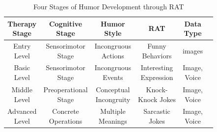 \documentclass[letterpaper]{article} %
\begin{document}
\begin{table}[tbp]
\begin{center}
\caption{Four Stages of Humor Development through RAT}
\scriptsize
\begin{tabular}{cccccc} %
\hline
\makecell{\textbf{Therapy} \\ \textbf{Stage}} & \makecell{\textbf{Cognitive} \\ \textbf{Stage}} & \makecell{\textbf{Humor} \\ \textbf{Style}} & \textbf{RAT} & \makecell{\textbf{Data} \\ \textbf{Type}}\\
\hline
\makecell{Entry \\ Level}&\makecell{Sensorimotor \\ Stage}&\makecell{Incongruous \\ Actions}&\makecell{Funny \\ Behaviors}& images\\
\hline
\makecell{Basic \\ Level}&\makecell{Sensorimotor \\ Stage}&\makecell{Incongruous \\ Events}&\makecell{Interesting \\ Expression}&\makecell{Image, \\ Voice}\\
\hline
\makecell{Middle \\ Level}&\makecell{Preoperational \\ Stage}&\makecell{Conceptual \\ Incongruity}&\makecell{Knock- \\Knock Jokes}&\makecell{Image, \\ Voice}\\
\hline
\makecell{Advanced \\ Level}&\makecell{Concrete \\ Operations}&\makecell{Multiple \\ Meanings}&\makecell{Sarcastic \\ Jokes}&\makecell{Image, \\ Voice}\\
\hline
\end{tabular}
\label{table: humor_rat}
\end{center}
\end{table}
\end{document}
